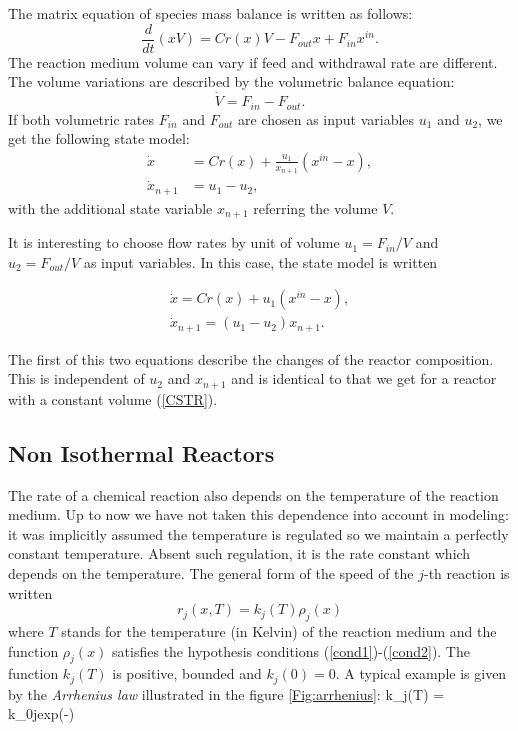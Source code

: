 The matrix equation of species mass balance is written as follows:
$$
\frac{d}{dt} (xV) = Cr(x)V - F_{out}x + F_{in}x^{in}.
$$
The reaction medium volume can vary if feed and withdrawal rate are different. The volume variations are described by the volumetric balance equation:
$$
\dot V = F_{in} -F_{out}.
$$
If both volumetric rates $F_{in}$ and $F_{out}$ are chosen as input variables $u_1$ and $u_2$, we get the following state model:
\begin{equation*} \begin{split}
\dot x &= Cr(x) + \frac{u_1}{x_{n+1}} (x^{in} - x), \\
\dot x_{n+1} &= u_1 - u_2,
\end{split} \end{equation*}
with the additional state variable $x_{n+1}$ referring the volume $V$.

It is interesting to choose flow rates by unit of volume $u_1 = F_{in}/V$ and $u_2 = F_{out}/V$ as input variables.
In this case, the state model is written

\begin{equation*} 
\begin{split}
\dot x = Cr(x) + u_1(x^{in} - x), \\
\dot x_{n+1}= (u_1 - u_2)x_{n+1}.
\end{split} 
\end{equation*}

The first of this two equations describe the changes of the reactor composition. 
This is independent of $u_2$ and $x_{n+1}$ and is identical to that we get for a reactor with a constant volume  (\ref{CSTR}). 

\subsection{Non Isothermal Reactors}

The rate of a chemical reaction also depends on the temperature of the reaction medium.
Up to now we have not taken this dependence into account in modeling: it was implicitly assumed the temperature is regulated so we maintain a perfectly constant temperature.
Absent such regulation, it is the rate constant which depends on the temperature. The general form of the speed of the $j$-th reaction is written
$$
r_j(x,T) = k_j(T)\rho_j(x)
$$
where $T$ stands for the temperature (in Kelvin) of the reaction medium and the function $\rho_j(x)$ satisfies the hypothesis conditions (\ref{cond1})-(\ref{cond2}). The function $k_j(T)$ is positive, bounded and $k_j(0) = 0$. A typical example is given by the {\it Arrhenius law} illustrated in the figure \ref{Fig:arrhenius}:
\eqnn
k_j(T) = k_{0j}exp(-)
\eeqnn

